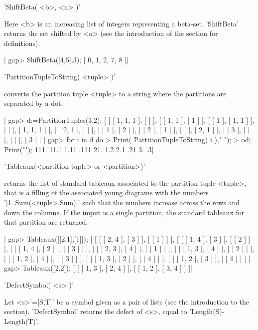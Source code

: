 'ShiftBeta( <b>, <n> )'

Here  <b>  is  an  increasing  list  of  integers  representing a beta-set.
'ShiftBeta'  returns the  set shifted  by <n>  (see the introduction of the
section for definitions).

|    gap> ShiftBeta([4,5],3);
    [ 0, 1, 2, 7, 8 ]|

%
%

'PartitionTupleToString( <tuple> )'

converts the partition tuple <tuple>  to a string where the partitions
are separated by a dot.

|    gap> d:=PartitionTuples(3,2);
    [ [ [ 1, 1, 1 ], [  ] ], [ [ 1, 1 ], [ 1 ] ], [ [ 1 ], [ 1, 1 ] ],
      [ [  ], [ 1, 1, 1 ] ], [ [ 2, 1 ], [  ] ], [ [ 1 ], [ 2 ] ],
      [ [ 2 ], [ 1 ] ], [ [  ], [ 2, 1 ] ], [ [ 3 ], [  ] ],
      [ [  ], [ 3 ] ] ]
    gap>  for i in d do
    >      Print( PartitionTupleToString( i ),"   ");
    >  od; Print("\n");
    111.   11.1   1.11   .111   21.   1.2   2.1   .21   3.   .3|

%
%

'Tableaux(<partition tuple> or <partition>)'

returns  the list  of standard  tableaux associated  to the partition tuple
<tuple>,  that  is  a  filling  of  the  associated young diagrams with the
numbers  '[1..Sum(<tuple>,Sum)]' such that the  numbers increase across the
rows and down the columns. If the imput is a single partition, the standard
tableaux for that partition are returned.

|    gap> Tableaux([[2,1],[1]]);
    [ [ [ [ 2, 4 ], [ 3 ] ], [ [ 1 ] ] ],
      [ [ [ 1, 4 ], [ 3 ] ], [ [ 2 ] ] ],
      [ [ [ 1, 4 ], [ 2 ] ], [ [ 3 ] ] ],
      [ [ [ 2, 3 ], [ 4 ] ], [ [ 1 ] ] ],
      [ [ [ 1, 3 ], [ 4 ] ], [ [ 2 ] ] ],
      [ [ [ 1, 2 ], [ 4 ] ], [ [ 3 ] ] ],
      [ [ [ 1, 3 ], [ 2 ] ], [ [ 4 ] ] ],
      [ [ [ 1, 2 ], [ 3 ] ], [ [ 4 ] ] ] ]
    gap> Tableaux([2,2]);
    [ [ [ 1, 3 ], [ 2, 4 ] ], [ [ 1, 2 ], [ 3, 4 ] ] ]|


'DefectSymbol( <s> )'

Let  <s>'=[S,T]'  be  a  symbol  given  as a  pair  of  lists  (see  the
introduction to the  section). 'DefectSymbol' returns the  defect of <s>,
equal to 'Length(S)-Length(T)'.


